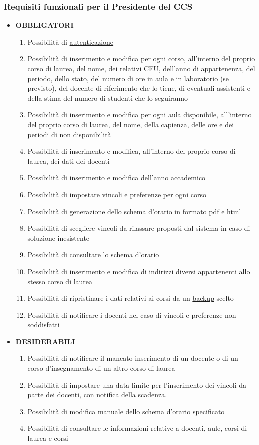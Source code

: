 \documentclass[11pt,a4paper]{article}
\begin{document}
\subsubsection{Requisiti funzionali per il Presidente del CCS}
\begin{itemize}
\item \textbf{OBBLIGATORI}
\begin{enumerate}
\item Possibilità di \underline{autenticazione}
\item Possibilità di inserimento e modifica per ogni corso, all'interno del proprio corso di laurea, del nome, dei relativi CFU, dell'anno di appartenenza, del periodo, dello stato, del numero di ore in aula e in laboratorio (se previsto), del docente di riferimento che lo tiene, di eventuali assistenti e della stima del numero di studenti che lo seguiranno
\item Possibilità di inserimento e modifica per ogni aula disponibile, all'interno del proprio corso di laurea, del nome, della capienza, delle ore e dei periodi di non disponibilità
\item Possibilità di inserimento e modifica, all'interno del proprio corso di laurea, dei dati dei docenti
\item Possibilità di inserimento e modifica dell'anno accademico
\item Possibilità di impostare vincoli e preferenze per ogni corso
\item Possibilità di generazione dello schema d'orario in formato \underline{pdf} e \underline{html}
\item Possibilità di scegliere vincoli da rilassare proposti dal sistema in caso di soluzione inesistente
\item Possibilità di consultare lo schema d'orario
\item Possibilità di inserimento e modifica di indirizzi diversi appartenenti allo stesso corso di laurea
\item Possibilità di ripristinare i dati relativi ai corsi da un \underline{backup} scelto
\item Possibilità di notificare i docenti nel caso di vincoli e preferenze non soddisfatti
\end{enumerate}
\item \textbf{DESIDERABILI}
\begin{enumerate}
\item Possibilità di notificare il mancato inserimento di un docente o di un corso d'insegnamento di un altro corso di laurea
\item Possibilità di impostare una data limite per l'inserimento dei vincoli da parte dei docenti, con notifica della scadenza.
\item Possibilità di modifica manuale dello schema d'orario specificato
\item Possibilità di consultare le informazioni relative a docenti, aule, corsi di laurea e corsi
\end{enumerate}
\end{itemize}
\end{document}
